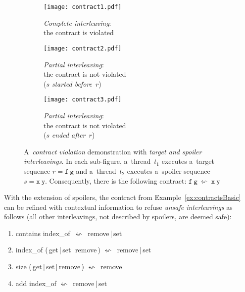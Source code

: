 \begin{figure}[hbt]
    \centering

    \begin{subfigure}[t]{.31 \linewidth}
        \centering
        \texttt{[image: contract1.pdf]}
        \caption{\emph{Complete interleaving}: \\ the contract is violated}
        \label{fig:contract1}
    \end{subfigure}
%
    \hfill
%
    \begin{subfigure}[t]{.31 \linewidth}
        \centering
        \texttt{[image: contract2.pdf]}
        \caption{\emph{Partial interleaving}: \\ the contract is not violated \\ ($ s $ \emph{started before}~$ r $)}
        \label{fig:contract2}
    \end{subfigure}
%
    \hfill
%
    \begin{subfigure}[t]{.31 \linewidth}
        \centering
        \texttt{[image: contract3.pdf]}
        \caption{\emph{Partial interleaving}: \\ the contract is not violated \\ ($ s $ \emph{ended after}~$ r $)}
        \label{fig:contract3}
    \end{subfigure}

    \caption{A~\emph{contract violation} demonstration with \emph{target and spoiler interleavings}. In each sub-figure, a~thread~$ t_1 $ executes a~target sequence $ r = \mathtt{f\ g} $ and a~thread~$ t_2 $ executes a~spoiler sequence $ s = \mathtt{x\ y} $. Consequently, there is the following contract: $ \mathtt{f\ g}\ \leftsquigarrow\ \mathtt{x\ y} $~\cite{muzikovskaBP}}
\end{figure}

\begin{example}
    With the extension of spoilers, the contract from Example~\ref{ex:contractsBasic} can be refined with contextual information to refuse \emph{unsafe interleavings} as follows (all other interleavings, not described by spoilers, are deemed  safe):
    \begin{enumerate}[label={($ \varrho^{\prime\prime}_{\arabic*} $)}]
        \tt
    
        \item contains index\_of\ $ \leftsquigarrow $\ remove\,|\,set

        \item index\_of (\,get\,|\,set\,|\,remove\,) $ \leftsquigarrow $\ remove\,|\,set
        
        \item size (\,get\,|\,set\,|\,remove\,) $ \leftsquigarrow $\ remove
        
        \item add index\_of $ \leftsquigarrow $\ remove\,|\,set
    \end{enumerate}
\end{example}


